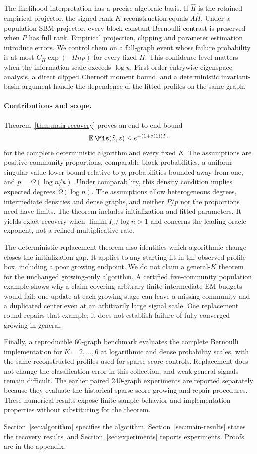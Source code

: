 The likelihood interpretation has a precise algebraic basis. If $\widehat\Pi$ is the retained empirical projector, the signed rank-$K$ reconstruction equals $A\widehat\Pi$. Under a population SBM projector, every block-constant Bernoulli contrast is preserved when $P$ has full rank. Empirical projection, clipping and parameter estimation introduce errors. We control them on a full-graph event whose failure probability is at most $C_H\exp(-Hnp)$ for every fixed $H$. This confidence level matters when the information scale exceeds $\log n$. First-order entrywise eigenspace analysis, a direct clipped Chernoff moment bound, and a deterministic invariant-basin argument handle the dependence of the fitted profiles on the same graph.

\paragraph{Contributions and scope.}
Theorem~\ref{thm:main-recovery} proves an end-to-end bound
\[
 \mathbb E\,\Mis(\widehat z,z)\le e^{-(1+o(1))I_n}
\]
for the complete deterministic algorithm and every fixed $K$. The assumptions are positive community proportions, comparable block probabilities, a uniform singular-value lower bound relative to $p$, probabilities bounded away from one, and $p=\Omega(\log n/n)$. Under comparability, this density condition implies expected degrees $\Omega(\log n)$. The assumptions allow heterogeneous degrees, intermediate densities and dense graphs, and neither $P/p$ nor the proportions need have limits. The theorem includes initialization and fitted parameters. It yields exact recovery when $\liminf I_n/\log n>1$ and concerns the leading oracle exponent, not a refined multiplicative rate.

The deterministic replacement theorem also identifies which algorithmic change closes the initialization gap. It applies to any starting fit in the observed profile box, including a poor growing endpoint. We do not claim a general-$K$ theorem for the unchanged growing-only algorithm. A certified five-community population example shows why a claim covering arbitrary finite intermediate EM budgets would fail: one update at each growing stage can leave a missing community and a duplicated center even at an arbitrarily large signal scale. One replacement round repairs that example; it does not establish failure of fully converged growing in general.

Finally, a reproducible 60-graph benchmark evaluates the complete Bernoulli implementation for $K=2,\ldots,6$ at logarithmic and dense probability scales, with the same reconstructed profiles used for sparse-score controls. Replacement does not change the classification error in this collection, and weak general signals remain difficult. The earlier paired 240-graph experiments are reported separately because they evaluate the historical sparse-score growing and repair procedures. These numerical results expose finite-sample behavior and implementation properties without substituting for the theorem.

Section~\ref{sec:algorithm} specifies the algorithm, Section~\ref{sec:main-results} states the recovery results, and Section~\ref{sec:experiments} reports experiments. Proofs are in the appendix.
